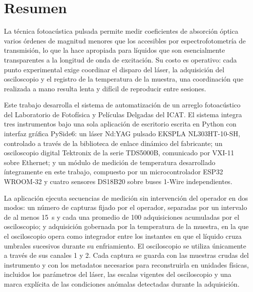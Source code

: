 \chapter*{Resumen}

La técnica fotoacústica pulsada permite medir coeficientes de absorción
óptica varios órdenes de magnitud menores que los accesibles por
espectrofotometría de transmisión, lo que la hace apropiada para
líquidos que son esencialmente transparentes a la longitud de onda de
excitación. Su costo es operativo: cada punto experimental exige
coordinar el disparo del láser, la adquisición del osciloscopio y el
registro de la temperatura de la muestra, una coordinación que
realizada a mano resulta lenta y difícil de reproducir entre sesiones.

Este trabajo desarrolla el sistema de automatización de un arreglo
fotoacústico del Laboratorio de Fotofísica y Películas Delgadas del
ICAT. El sistema integra tres instrumentos bajo una sola aplicación de
escritorio escrita en Python con interfaz gráfica PySide6: un láser
Nd:YAG pulsado EKSPLA NL303HT-10-SH, controlado a través de la
biblioteca de enlace dinámico del fabricante; un osciloscopio digital
Tektronix de la serie TDS5000B, comunicado por VXI-11 sobre Ethernet; y
un módulo de medición de temperatura desarrollado íntegramente en este
trabajo, compuesto por un microcontrolador ESP32 WROOM-32 y cuatro
sensores DS18B20 sobre buses 1-Wire independientes.

La aplicación ejecuta secuencias de medición sin intervención del
operador en dos modos: un número de capturas fijado por el operador,
separadas por un intervalo de al menos \SI{15}{\second} y cada una
promedio de 100 adquisiciones acumuladas por el osciloscopio; y
adquisición gobernada por la temperatura de la muestra, en la que el
osciloscopio opera como integrador entre los instantes en que el
líquido cruza umbrales sucesivos durante su enfriamiento. El
osciloscopio se utiliza únicamente a través de sus canales 1 y 2. Cada
captura se guarda con las muestras crudas del instrumento y con los metadatos
necesarios para reconstruirla en unidades físicas, incluidos los
parámetros del láser, las escalas vigentes del osciloscopio y una
marca explícita de las condiciones anómalas detectadas durante la
adquisición.

